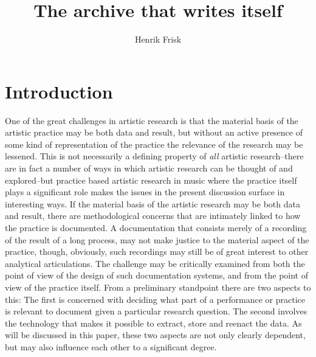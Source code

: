 \documentclass[11pt,a4paper]{article}
\author{Henrik Frisk}
\title{The archive that writes itself}
\begin{document}
\maketitle

\section*{Introduction}
\label{sec:introduction}
\noindent
One of the great challenges in artistic research is that the material basis of the artistic practice may be both data and result, but without an active presence of some kind of representation of the practice the relevance of the research may be lessened. This is not necessarily a defining property of \emph{all} artistic research--there are in fact a number of ways in which artistic research can be thought of and explored--but practice based artistic research in music where the practice itself plays a significant role makes the issues in the present discussion surface in interesting ways. If the material basis of the artistic research may be both data and result, there are methodological concerns that are intimately linked to how the practice is documented.
A documentation that consists merely of a recording of the result of a long process, may not make justice to the material aspect of the practice, though, obviously, such recordings may still be of great interest to other analytical articulations. 
The challenge may be critically examined from both the point of view of the design of such documentation systems, and from the point of view of the practice itself. From a preliminary standpoint there are two aspects to this: The first is concerned with deciding what part of a performance or practice is relevant to document given a particular research question. The second involves the technology that makes it possible to extract, store and reenact the data. As will be discussed in this paper, these two aspects are not only clearly dependent, but may also influence each other to a significant degree.
\end{document}
